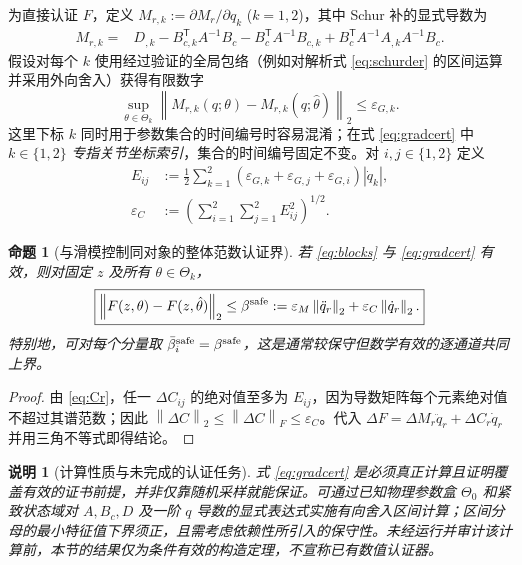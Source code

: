 \documentclass[journal,onecolumn]{IEEEtran}
\newtheorem{proposition}{命题}[section]
\newtheorem{remark}{说明}[section]
\newcommand{\norm}[1]{\left\lVert#1\right\rVert}
\newcommand{\tr}{\mathsf T}
\begin{document}
为直接认证 $F$，定义 $M_{r,k}:=\partial M_r/\partial q_k$ ($k=1,2$)，其中 Schur 补的显式导数为
\begin{align}
 M_{r,k}={}&D_{,k}-B_{c,k}^\tr A^{-1}B_c-B_c^\tr A^{-1}B_{c,k}
 +B_c^\tr A^{-1}A_{,k}A^{-1}B_c.\label{eq:schurder}
\end{align}
假设对每个 $k$ 使用经过验证的全局包络（例如对解析式 \eqref{eq:schurder} 的区间运算并采用外向舍入）获得有限数字
\begin{equation}
 \sup_{\theta\in\Theta_k}\norm{M_{r,k}(q;\theta)-M_{r,k}(q;\hat\theta)}_2\le\varepsilon_{G,k}.\label{eq:gradcert}
\end{equation}
这里下标 $k$ 同时用于参数集合的时间编号时容易混淆；在式 \eqref{eq:gradcert} 中 $k\in\{1,2\}$ \emph{专指关节坐标索引}，集合的时间编号固定不变。对 $i,j\in\{1,2\}$ 定义
\begin{align}
 E_{ij}&:=\frac12\sum_{k=1}^2(\varepsilon_{G,k}+\varepsilon_{G,j}+\varepsilon_{G,i})|\dot q_k|,\\
 \varepsilon_C&:=\left(\sum_{i=1}^2\sum_{j=1}^2 E_{ij}^2\right)^{1/2}.\label{eq:epsC}
\end{align}
\begin{proposition}[与滑模控制同对象的整体范数认证界]
若 \eqref{eq:blocks} 与 \eqref{eq:gradcert} 有效，则对固定 $z$ 及所有 $\theta\in\Theta_k$，
\begin{equation}
 \boxed{\norm{F(z,\theta)-F(z,\hat\theta)}_2\le\beta^{\rm safe}:=\varepsilon_M\norm{\ddot q_r}_2+\varepsilon_C\norm{\dot q_r}_2.}\label{eq:safebound}
\end{equation}
特别地，可对每个分量取 $\bar\beta_i^{\rm safe}=\beta^{\rm safe}$，这是通常较保守但数学有效的逐通道共同上界。
\end{proposition}
\begin{proof}
由 \eqref{eq:Cr}，任一 $\Delta C_{ij}$ 的绝对值至多为 $E_{ij}$，因为导数矩阵每个元素绝对值不超过其谱范数；因此 $\norm{\Delta C}_2\le\norm{\Delta C}_F\le\varepsilon_C$。代入 $\Delta F=\Delta M_r\ddot q_r+\Delta C_r\dot q_r$ 并用三角不等式即得结论。
\end{proof}
\begin{remark}[计算性质与未完成的认证任务]
式 \eqref{eq:gradcert} 是\emph{必须真正计算且证明覆盖有效}的证书前提，并非仅靠随机采样就能保证。可通过已知物理参数盒 $\Theta_0$ 和紧致状态域对 $A,B_c,D$ 及一阶 $q$ 导数的显式表达式实施有向舍入区间计算；区间分母的最小特征值下界须正，且需考虑依赖性所引入的保守性。未经运行并审计该计算前，本节的结果仅为\emph{条件有效的构造定理}，不宣称已有数值认证器。
\end{remark}
\end{document}
